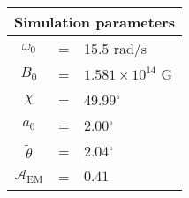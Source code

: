  \begin{tabular}{ccl}
\multicolumn{3}{c}{Simulation parameters} \\
\hline
$\omega_0$  &=& 15.5 rad/s\\
$B_0$  &=& $ 1.581\times 10^{14} $ G \\
$\chi$  &=& 49.99$^{\circ}$ \\
$a_0$ &=& 2.00$^{\circ}$ \\
$\tilde{\theta}$ &= & 2.04$^{\circ}$ \\
$\mathcal{A}_{\mathrm{EM}}$ &= & $0.41$
\end{tabular}
    